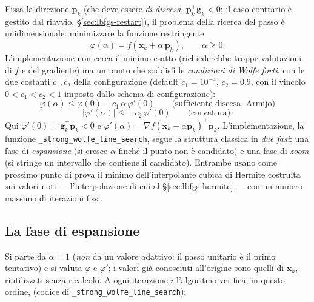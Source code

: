 Fissa la direzione $\bm{p}_k$ (che deve essere \emph{di discesa},
$\bm{p}_k^{\!\top}\bm{g}_k < 0$; il caso contrario è gestito dal riavvio,
\/\S\ref{sec:lbfgs-restart}), il problema della ricerca del passo è
unidimensionale: minimizzare la funzione restringente
\begin{equation}
\label{eq:phi}
\varphi(\alpha) = f(\bm{x}_k + \alpha\,\bm{p}_k),
\qquad \alpha \ge 0.
\end{equation}
L'implementazione non cerca il minimo esatto (richiederebbe troppe
valutazioni di $f$ e del gradiente) ma un punto che soddisfi le
\emph{condizioni di Wolfe forti}, con le due costanti $c_1, c_2$ della
configurazione (default $c_1 = 10^{-4}$, $c_2 = 0{.}9$, con il vincolo
$0 < c_1 < c_2 < 1$ imposto dallo schema di configurazione):
\begin{equation}
\label{eq:wolfe}
\varphi(\alpha) \le \varphi(0) + c_1\,\alpha\,\varphi'(0)
\qquad\text{(sufficiente discesa, Armijo)}
\end{equation}
\begin{equation}
\label{eq:wolfe-curv}
\bigl|\varphi'(\alpha)\bigr| \le -\,c_2\,\varphi'(0)
\qquad\text{(curvatura)}.
\end{equation}
Qui $\varphi'(0) = \bm{g}_k^{\!\top}\bm{p}_k < 0$ e
$\varphi'(\alpha) = \nabla f(\bm{x}_k + \alpha\bm{p}_k)^{\!\top}\bm{p}_k$.
L'implementazione, la funzione \texttt{\_strong\_wolfe\_line\_search},
segue la struttura classica in \emph{due fasi}: una fase di
\emph{espansione} (si cresce $\alpha$ finché il punto non è candidato) e una
fase di \emph{zoom} (si stringe un intervallo che contiene il candidato).
Entrambe usano come prossimo punto di prova il minimo dell'interpolante
cubica di Hermite costruita sui valori noti — l'interpolazione di cui al
\/\S\ref{sec:lbfgs-hermite} — con un numero massimo di iterazioni fissi.

\subsection{La fase di espansione}

Si parte da $\alpha = 1$ (\emph{non} da un valore adattivo: il passo
unitario è il primo tentativo) e si valuta $\varphi$ e $\varphi'$; i valori
già conosciuti all'origine sono quelli di $\bm{x}_k$, riutilizzati senza
ricalcolo. A ogni iterazione $i$ l'algoritmo verifica, in questo ordine,
(codice di \texttt{\_strong\_wolfe\_line\_search}):

